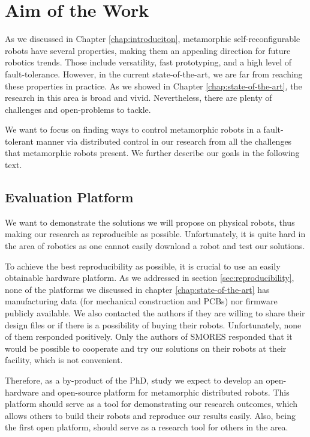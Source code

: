 \chapter{Aim of the Work}

As we discussed in Chapter \ref{chap:introduciton}, metamorphic
self-reconfigurable robots have several properties, making them an appealing
direction for future robotics trends. Those include versatility, fast
prototyping, and a high level of fault-tolerance. However, in the current
state-of-the-art, we are far from reaching these properties in practice. As we
showed in Chapter \ref{chap:state-of-the-art}, the research in this area is
broad and vivid. Nevertheless, there are plenty of challenges and open-problems to
tackle.

We want to focus on finding ways to control metamorphic robots in
a fault-tolerant manner via distributed control in our research from all the
challenges that metamorphic robots present. We further describe our goals in the
following text.

\section{Evaluation Platform}

We want to demonstrate the solutions we will propose on physical robots, thus
making our research as reproducible as possible. Unfortunately, it is quite hard
in the area of robotics as one cannot easily download a robot and test our
solutions.

To achieve the best reproducibility as possible, it is crucial to use an easily
obtainable hardware platform. As we addressed in section
\ref{sec:reproducibility}, none of the platforms we discussed in chapter
\ref{chap:state-of-the-art} has manufacturing data (for mechanical construction
and PCBs) nor firmware publicly available. We also contacted the authors if they
are willing to share their design files or if there is a possibility of buying
their robots. Unfortunately, none of them responded positively. Only the authors
of SMORES \cite{DBLP:conf/iros/DaveyKY12} responded that it would be possible to
cooperate and try our solutions on their robots at their facility, which is not
convenient.

Therefore, as a by-product of the PhD, study we expect to develop an
open-hardware and open-source platform for metamorphic distributed robots. This
platform should serve as a tool for demonstrating our research outcomes, which
allows others to build their robots and reproduce our results easily. Also,
being the first open platform, should serve as a research tool for others in
the area.

